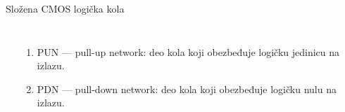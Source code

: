 \begin{frame}[label=09_3-s025]{Složena CMOS logička kola}
\begin{columns}[c,onlytextwidth]
\begin{center}

\end{center}
\begin{enumerate}
\item \alert{PUN — pull-up network:} deo kola koji obezbeđuje logičku jedinicu na izlazu.
\item \alert{PDN — pull-down network:} deo kola koji obezbeđuje logičku nulu na izlazu.
\end{enumerate}
\end{columns}
\end{frame}
